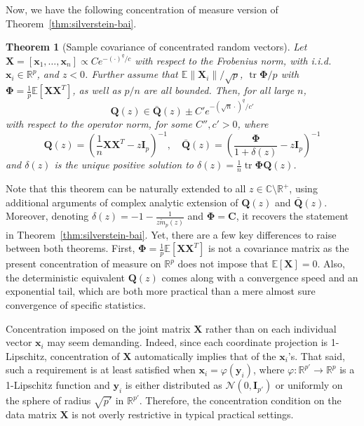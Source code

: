 \documentclass[12pt]{article}
\newtheorem{theorem}{Theorem}
\DeclareMathOperator{\tr}{tr}
\begin{document}
Now, we have the following concentration of measure version of Theorem~\ref{thm:silverstein-bai}.
\begin{theorem}[Sample covariance of concentrated random vectors]\label{thm:sample-covariance-concentrated-random-vectors}
Let $ \mathbf{X} = [\mathbf{x}_1, \ldots, \mathbf{x}_n] \propto C e^{-(\cdot)^q / c} $ with respect to the Frobenius norm, with i.i.d. $ \mathbf{x}_i \in \mathbb{R}^p $, and $ z < 0 $. Further assume that $\mathbb{E}\|\mathbf{X}_i\|/\sqrt{p}$, $\tr\boldsymbol{\Phi}/p$ with $\boldsymbol{\Phi} = \frac{1}{p}\mathbb{E}[\mathbf{X}\mathbf{X}^T]$, as well as $p/n$ are all bounded. Then, for all large $n$,
$$
\mathbf{Q}(z) \in \bar{\mathbf{Q}}(z) \pm C'e^{-(\sqrt{n}\cdot)^q/c'}
$$
with respect to the operator norm, for some $C'', c' > 0$, where
$$
\mathbf{Q}(z) = \left(\frac{1}{n} \mathbf{X} \mathbf{X}^T - z \mathbf{I}_p\right)^{-1},\quad\bar{\mathbf{Q}}(z) = \left(\frac{\boldsymbol{\Phi}}{1 + \delta(z)} - z\mathbf{I}_p\right)^{-1}
$$
and $\delta(z)$ is the unique positive solution to $\delta(z) = \frac{1}{n} \tr\boldsymbol{\Phi}\mathbf{Q}(z)$.
\end{theorem}
Note that this theorem can be naturally extended to all $z \in \mathbb{C} \setminus \mathbb{R}^+$, using additional arguments of complex analytic extension of $\mathbf{Q}(z)$ and $\bar{\mathbf{Q}}(z)$. Moreover, denoting $\delta(z) = -1 - \frac{1}{z\tilde{m}_p(z)}$ and $\boldsymbol{\Phi} = \mathbf{C}$, it recovers the statement in Theorem~\ref{thm:silverstein-bai}. Yet, there are a few key differences to raise between both theorems. First, $\boldsymbol{\Phi} = \frac{1}{p}\mathbb{E}[\mathbf{X}\mathbf{X}^T]$ is not a covariance matrix as the present concentration of measure on $\mathbb{R}^p$ does not impose that $\mathbb{E}[\mathbf{X}] = 0$. Also, the deterministic equivalent $\mathbf{Q}(z)$ comes along with a convergence speed and an exponential tail, which are both more practical than a mere almost sure convergence of specific statistics.

Concentration imposed on the joint matrix $\mathbf{X}$ rather than on each individual vector $\mathbf{x}_i$ may seem demanding. Indeed, since each coordinate projection is 1-Lipschitz, concentration of $\mathbf{X}$ automatically implies that of the $\mathbf{x}_i$'s. That said, such a requirement is at least satisfied when $\mathbf{x}_i = \varphi(\mathbf{y}_i)$, where $\varphi : \mathbb{R}^{p'} \to \mathbb{R}^p$ is a 1-Lipschitz function and $\mathbf{y}_i$ is either distributed as $\mathcal{N}(0, \mathbf{I}_{p'})$ or uniformly on the sphere of radius $\sqrt{p'}$ in $\mathbb{R}^{p'}$. Therefore, the concentration condition on the data matrix $\mathbf{X}$ is not overly restrictive in typical practical settings.
\end{document}
